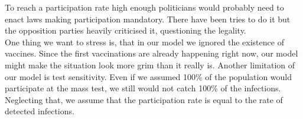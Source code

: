 \documentclass
[
    report,
    11pt,
    bibliography = totoc,
    listof = totoc,
    headinclude = true,
]
{scrreport}
\begin{document}
To reach a participation rate high enough politicians would probably need to enact laws making participation mandatory. There have been tries to do it but the opposition parties heavily criticised it, questioning the legality. \\

One thing we want to stress is, that in our model we ignored the existence of vaccines. Since the first vaccinations are already happening right now, our model might make the situation look more grim than it really is.
Another limitation of our model is test sensitivity.
Even if we assumed 100\% of the population would participate at the mass test,
we still would not catch 100\% of the infections.
Neglecting that, we assume that the participation rate is equal to the rate
of detected infections.

\begingroup
\renewcommand{\cleardoublepage}{}
\renewcommand{\clearpage}{}
\printbibliography
\endgroup
\end{document}

